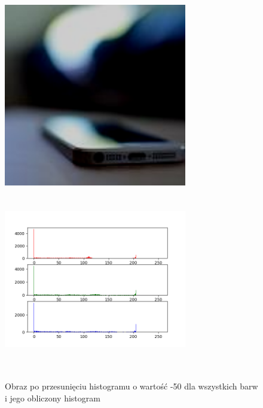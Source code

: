 \documentclass[a4paper,12pt]{book}
\begin{document}
\begin{figure}[H]
	\caption{Obraz po przesunięciu histogramu o wartość -50 dla wszystkich barw i jego obliczony histogram}
	\includegraphics[width=8cm, height=8cm]{6-2/move-histogram-image-phone-(-50,-50,-50).png}
	\includegraphics[width=8cm, height=8cm]{6-2/move-histogram-phone-(-50,-50,-50).png}
\end{figure}
\end{document}

